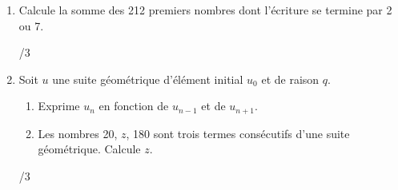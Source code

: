 \begin{enumerate}
			\item
				\begin{minipage}[t]{.9\textwidth}
					Calcule la somme des 212 premiers nombres dont l'écriture se termine par 2 ou 7.
				\end{minipage}%
				\begin{minipage}{.1\textwidth}
					\begin{flushright}
						{\large /3}
					\end{flushright}
				\end{minipage}
				\vspace{1em}
			
			\item
				\begin{minipage}[t]{.9\textwidth}
					Soit $u$ une suite géométrique d'élément initial $u_0$ et de raison $q$.
					\begin{enumerate}
						\item Exprime $u_n$ en fonction de $u_{n-1}$ et de $u_{n+1}$.
						\item Les nombres 20, $z$, 180 sont trois termes consécutifs d'une suite géométrique. Calcule $z$.
					\end{enumerate}
				\end{minipage}%
				\begin{minipage}{.1\textwidth}
					\begin{flushright}
						{\large /3}
					\end{flushright}
				\end{minipage}
				\vspace{1em}
			
	\end{enumerate}
	
